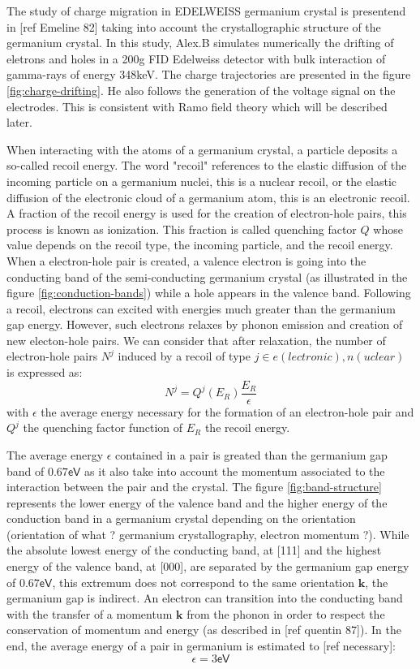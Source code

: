 The study of charge migration in EDELWEISS germanium crystal is presentend in [ref Emeline 82] taking into account the crystallographic structure of the germanium crystal. In this study, Alex.B simulates numerically the drifting of eletrons and holes in a 200g FID Edelweiss detector with bulk interaction of gamma-rays of energy 348keV. The charge trajectories are presented in the figure \ref{fig:charge-drifting}. He also follows the generation of the voltage signal on the electrodes. This is consistent with Ramo field theory which will be described later.

When interacting with the atoms of a germanium crystal, a particle deposits a so-called recoil energy. The word "recoil" references to the elastic diffusion of the incoming particle on a germanium nuclei, this is a nuclear recoil, or the elastic diffusion of the electronic cloud of a germanium atom, this is an electronic recoil. A fraction of the recoil energy is used for the creation of electron-hole pairs, this process is known as ionization. This fraction is called quenching factor $Q$ whose value depends on the recoil type, the incoming particle, and the recoil energy. When a electron-hole pair is created, a valence electron is going into the conducting band of the semi-conducting germanium crystal (as illustrated in the figure \ref{fig:conduction-bands}) while a hole appears in the valence band. Following a recoil, electrons can excited with energies much greater than the germanium gap energy. However, such electrons relaxes by phonon emission and creation of new electon-hole pairs. We can consider that after relaxation, the number of electron-hole pairs $N^j$ induced by a recoil of type $j \in {e(lectronic), n(uclear)}$ is expressed as:
\begin{equation}
\label{eq:number-pairs}
N^j = Q^j \left( E_R \right) \frac{E_R}{\epsilon}
\end{equation}
with $\epsilon$ the average energy necessary for the formation of an electron-hole pair and $Q^j$ the quenching factor function of $E_R$ the recoil energy.

The average energy $\epsilon$ contained in a pair is greated than the germanium gap band of $0.67\textsf{eV}$ as it also take into account the momentum associated to the interaction between the pair and the crystal. The figure \ref{fig:band-structure} represents the lower energy of the valence band and the higher energy of the conduction band in a germanium crystal depending on the orientation (orientation of what ? germanium crystallography, electron momentum ?). While the absolute lowest energy of the conducting band, at [111] and the highest energy of the valence band, at [000], are separated by the germanium gap energy of $0.67\textsf{eV}$, this extremum does not correspond to the same orientation $\bm{k}$, the germanium gap is indirect. An electron can transition into the conducting band with the transfer of a momentum $\bm{k}$ from the phonon in order to respect the conservation of momentum and energy (as described in [ref quentin 87]). In the end, the average energy of a pair in germanium is estimated to [ref necessary]:
\begin{equation}
\label{eq:energy-pair}
\epsilon = 3 \textsf{eV}
\end{equation} 

